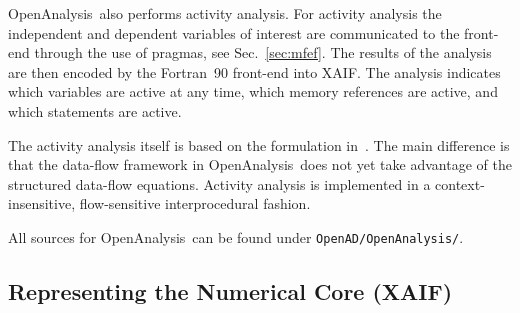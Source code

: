 \documentclass{book}
\newcommand{\OpenAnalysis}{OpenAnalysis}
\newcommand{\xaif}{XAIF}
\newcommand{\refsec}[1]{{Sec.~\ref{#1}}}
\begin{document}
\OpenAnalysis\ also performs activity analysis.  For activity analysis
the independent and dependent variables of interest are communicated
to the front-end through the use of pragmas, see \refsec{sec:mfef}.
The results of the analysis are then encoded by the Fortran~90
front-end into \xaif.  The analysis indicates which variables are
active at any time, which memory references are active, and which
statements are active.

The activity analysis itself is based on the formulation in~\cite{Hascoet2005bra}.
The main difference is that the data-flow framework in \OpenAnalysis\ does not
yet take advantage of the structured data-flow equations.  Activity analysis is
implemented in a context-insensitive, flow-sensitive interprocedural fashion.

All sources for \OpenAnalysis\ can be found under \lstinline{OpenAD/OpenAnalysis/}.

\subsection{Representing the Numerical Core (\xaif)} \label{sec:xaif}
\end{document}
